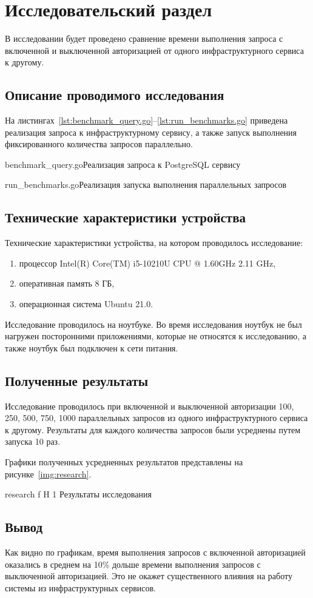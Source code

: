 \chapter{Исследовательский раздел}

В исследовании будет проведено сравнение времени выполнения запроса с включенной и выключенной авторизацией от одного инфраструктурного сервиса к другому.

\section{Описание проводимого исследования}
На листингах~\ref{lst:benchmark_query.go}--\ref{lst:run_benchmarks.go} приведена реализация запроса к инфраструктурному сервису, а также запуск выполнения фиксированного количества запросов параллельно.

	{benchmark_query.go}{Реализация запроса к PostgreSQL сервису}
	
	{run_benchmarks.go}{Реализация запуска выполнения параллельных запросов}

\section{Технические характеристики устройства}

Технические характеристики устройства, на котором проводилось исследование:
\begin{enumerate}
\item процессор Intel(R) Core(TM) i5-10210U CPU @ 1.60GHz 2.11 GHz,
\item оперативная память 8 ГБ,
\item операционная система Ubuntu 21.0.
\end{enumerate}

Исследование проводилось на ноутбуке. Во время исследования ноутбук не был нагружен посторонними приложениями, которые не относятся к исследованию, а также ноутбук был подключен к сети питания.

\section{Полученные результаты}
Исследование проводилось при включенной и выключенной авторизации 100, 250, 500, 750, 1000 параллельных запросов из одного инфраструктурного сервиса к другому. Результаты для каждого количества запросов были усреднены путем запуска 10 раз.

Графики полученных усредненных результатов представлены на рисунке~\ref{img:research}.

    {research}
    {f}
    {H}
    {1\textwidth}
    {Результаты исследования}

\section*{Вывод}
Как видно по графикам, время выполнения запросов с включенной авторизацией оказались в среднем на 10\% дольше времени выполнения запросов с выключенной авторизацией. Это не окажет существенного влияния на работу системы из инфраструктурных сервисов.

